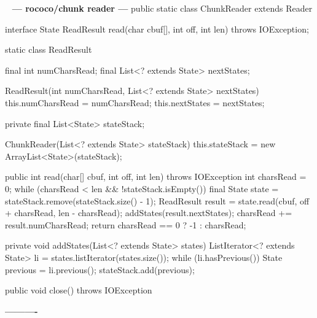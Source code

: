 \documentclass{book}
\newenvironment{chunk}[1]{%
{\ }\newline\noindent%
\hbox{\hskip 2.0cm}{\bf --- #1 ---}%
\verbatim}%                               say exactly what we see
{\endverbatim%
\par{}%
\noindent{}%
\hbox{\hskip 2.0cm}{\bf ----------}%
\par%
\normalsize\noindent}%
\begin{document}
\begin{chunk}{rococo/chunk reader}
public static class ChunkReader extends Reader {
    interface State {
        ReadResult read(char cbuf[], int off, int len) throws IOException;
    }

    static class ReadResult {
        final int numCharsRead;
        final List<? extends State> nextStates;

        ReadResult(int numCharsRead, List<? extends State> nextStates) {
            this.numCharsRead = numCharsRead;
            this.nextStates = nextStates;
        }
    }

    private final List<State> stateStack;

    ChunkReader(List<? extends State> stateStack) {
        this.stateStack = new ArrayList<State>(stateStack);
    }

    public int read(char[] cbuf, int off, int len) throws IOException {
        int charsRead = 0;
        while (charsRead < len && !stateStack.isEmpty()) {
            final State state = stateStack.remove(stateStack.size() - 1);
            ReadResult result = state.read(cbuf, off + charsRead, len - charsRead);
            addStates(result.nextStates);
            charsRead += result.numCharsRead;
        }
        return charsRead == 0 ? -1 : charsRead;
    }

    private void addStates(List<? extends State> states) {
        ListIterator<? extends State> li = states.listIterator(states.size());
        while (li.hasPrevious()) {
            State previous = li.previous();
            stateStack.add(previous);
        }
    }

    public void close() throws IOException {
    }
}
\end{chunk}
\end{document}
